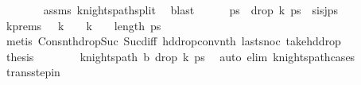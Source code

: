 \begin{isabellebody}
\ \ \ \ \ \ \isamarkupfalse%
\ assms\ knights{\isacharunderscore}{\kern0pt}path{\isacharunderscore}{\kern0pt}split\ \isamarkupfalse%
\ blast\isanewline
\isanewline
\ \ \ \ \isamarkupfalse%
\ ps{\isacharprime}{\kern0pt}\ \ {\isachardoublequoteopen}drop\ {\isacharparenleft}{\kern0pt}k{\isacharminus}{\kern0pt}{}{\isacharparenright}{\kern0pt}\ ps\ {\isacharequal}{\kern0pt}\ s\isactrlsub i{\isacharhash}{\kern0pt}s\isactrlsub j{\isacharhash}{\kern0pt}ps{\isacharprime}{\kern0pt}{\isachardoublequoteclose}\isanewline
\ \ \ \ \ \ \isamarkupfalse%
\ k{\isacharunderscore}{\kern0pt}prems\ {\isacartoucheopen}{}\ {\isacharless}{\kern0pt}\ k\ {\isacharminus}{\kern0pt}\ {}\ {\isasymand}\ k\ {\isacharminus}{\kern0pt}\ {}\ {\isacharless}{\kern0pt}\ length\ ps{\isacartoucheclose}\isanewline
\ \ \ \ \ \ \isamarkupfalse%
\ {\isacharparenleft}{\kern0pt}metis\ Cons{\isacharunderscore}{\kern0pt}nth{\isacharunderscore}{\kern0pt}drop{\isacharunderscore}{\kern0pt}Suc\ Suc{\isacharunderscore}{\kern0pt}diff{\isacharunderscore}{\kern0pt}{}\ hd{\isacharunderscore}{\kern0pt}drop{\isacharunderscore}{\kern0pt}conv{\isacharunderscore}{\kern0pt}nth\ last{\isacharunderscore}{\kern0pt}snoc\ take{\isacharunderscore}{\kern0pt}hd{\isacharunderscore}{\kern0pt}drop{\isacharparenright}{\kern0pt}\isanewline
\ \ \ \ \isamarkupfalse%
\ \isamarkupfalse%
\ {\isacharquery}{\kern0pt}thesis\isanewline
\ \ \ \ \ \ \isamarkupfalse%
\ {\isacartoucheopen}knights{\isacharunderscore}{\kern0pt}path\ b\ {\isacharparenleft}{\kern0pt}drop\ {\isacharparenleft}{\kern0pt}k{\isacharminus}{\kern0pt}{}{\isacharparenright}{\kern0pt}\ ps{\isacharparenright}{\kern0pt}{\isacartoucheclose}\ \isamarkupfalse%
\ {\isacharparenleft}{\kern0pt}auto\ elim{\isacharcolon}{\kern0pt}\ knights{\isacharunderscore}{\kern0pt}path{\isachardot}{\kern0pt}cases{\isacharparenright}{\kern0pt}\isanewline
\ \ \isamarkupfalse%
\isanewline
{}\isamarkupfalse%
%
\endisatagproof
{\isafoldproof}%
%
\isadelimproof
\isanewline
%
\endisadelimproof
\isanewline
{}\isamarkupfalse%
\ trans{\isacharunderscore}{\kern0pt}step{\isacharunderscore}{\kern0pt}in{\isacharcolon}{\kern0pt}\ \isanewline

\end{isabellebody}
